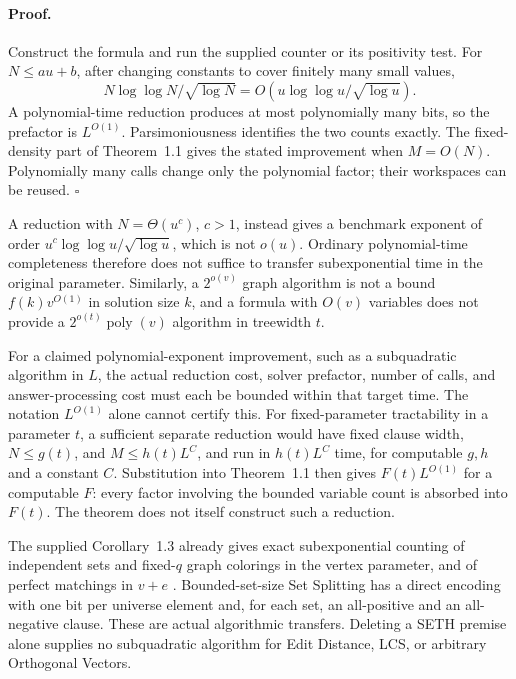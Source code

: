 \documentclass[11pt,a4paper]{article}
\begin{document}
\paragraph{Proof.}
Construct the formula and run the supplied counter or its positivity
test. For \(N\leq au+b\), after changing constants to cover finitely
many small values,
\[
 N\log\log N/\sqrt{\log N}
 =O(u\log\log u/\sqrt{\log u}).
\]
A polynomial-time reduction produces at most polynomially many bits,
so the prefactor is \(L^{O(1)}\).
Parsimoniousness identifies the two counts exactly.
The fixed-density part of Theorem~1.1 gives the stated improvement
when \(M=O(N)\).
Polynomially many calls change only the polynomial factor; their
workspaces can be reused.
\hfill\(\square\)

A reduction with \(N=\Theta(u^c)\), \(c>1\), instead gives a benchmark
exponent of order \(u^c\log\log u/\sqrt{\log u}\), which is not \(o(u)\).
Ordinary polynomial-time completeness therefore does not suffice to
transfer subexponential time in the original parameter.
Similarly, a \(2^{o(v)}\) graph algorithm is not a bound
\(f(k)v^{O(1)}\) in solution size \(k\), and a formula with \(O(v)\)
variables does not provide a \(2^{o(t)}\operatorname{poly}(v)\)
algorithm in treewidth \(t\).

For a claimed polynomial-exponent improvement, such as a
subquadratic algorithm in \(L\), the actual reduction cost,
solver prefactor, number of calls, and answer-processing cost must
each be bounded within that target time.
The notation \(L^{O(1)}\) alone cannot certify this.
For fixed-parameter tractability in a parameter \(t\), a sufficient
separate reduction would have fixed clause width,
\(N\leq g(t)\), and \(M\leq h(t)L^C\), and run in
\(h(t)L^C\) time, for computable \(g,h\) and a constant \(C\).
Substitution into Theorem~1.1 then gives
\(F(t)L^{O(1)}\) for a computable \(F\): every factor involving
the bounded variable count is absorbed into \(F(t)\).
The theorem does not itself construct such a reduction.

The supplied Corollary~1.3 already gives exact subexponential counting
of independent sets and fixed-\(q\) graph colorings in the vertex
parameter, and of perfect matchings in \(v+e\)
\cite[Corollary~1.3]{OpenAIETH}.
Bounded-set-size Set Splitting has a direct encoding with one bit per
universe element and, for each set, an all-positive and an all-negative
clause. These are actual algorithmic transfers.
Deleting a SETH premise alone supplies no subquadratic algorithm for
Edit Distance, LCS, or arbitrary Orthogonal Vectors.
\end{document}
